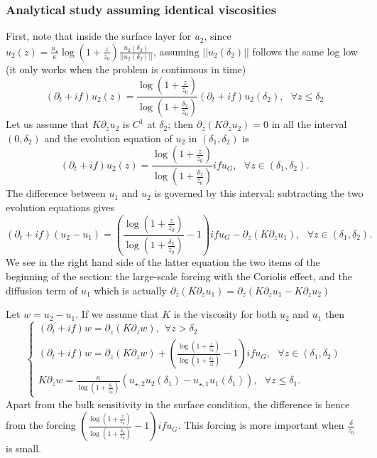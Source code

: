 \subsubsection{Analytical study assuming identical viscosities}
First, note that inside the surface layer for $u_2$,
since $u_2(z) = \frac{u_\star}{\kappa}\log(1+\frac{z}{z_0})
\frac{u_2(\delta_{2})}{||u_2(\delta_{2})||}$, assuming
$||u_2(\delta_{2})||$ follows the same log low (it only works
when the problem is continuous in time)
\begin{equation}
(\partial_t + if) u_2(z) = \frac{\log(1+\frac{z}{z_0})}
{\log(1+\frac{\delta_2}{z_0})}(\partial_t + if) u_2(\delta_2), 
~~~\forall z \leq \delta_2
\end{equation}
Let us assume that $K\partial_z u_2$ is $C^1$ at $\delta_2$;
then $\partial_z (K\partial_z u_2) = 0$ in all the interval
$(0, \delta_2)$ and the evolution equation of $u_2$ in
$(\delta_1, \delta_2)$ is
\begin{equation}
(\partial_t + if) u_2(z) = \frac{\log(1+\frac{z}{z_0})}
{\log(1+\frac{\delta_2}{z_0})} i f u_G, 
	~~~\forall z \in (\delta_1, \delta_2).
\end{equation}
The difference between $u_1$ and $u_2$ is governed by this interval:
subtracting the two evolution equations gives
\begin{equation}
(\partial_t + if) (u_2 - u_1) = \left(\frac{\log(1+\frac{z}{z_0})}
{\log(1+\frac{\delta_2}{z_0})} - 1\right)i f u_G 
-
\partial_z (K \partial_z u_1), ~~~\forall z \in (\delta_1, \delta_2).
\end{equation}
We see in the right hand side of the latter equation the two items
of the beginning of the section:
the large-scale forcing with the Coriolis effect,
and the diffusion term of $u_1$ which is actually
$\partial_z (K \partial_z u_1) = \partial_z (K \partial_z u_1 - K \partial_z u_2)$

Let $w=u_2 - u_1$. If we assume that $K$ is the viscosity for both
$u_2$ and $u_1$ then
\begin{equation}
	\begin{cases}
		(\partial_t + if) w = \partial_z (K \partial_z w) ,
		~~ \forall z > \delta_2 \\
(\partial_t + if) w = \partial_z (K \partial_z w) + \left(\frac{\log(1+\frac{z}{z_0})}
{\log(1+\frac{\delta_2}{z_0})} - 1\right)i f u_G 
, ~~~\forall z \in (\delta_1, \delta_2) \\
		K \partial_z w = \frac{\kappa}
		{\log(1+\frac{\delta_1}{z_0})}\left(
		u_{\star, 2} u_2(\delta_1) -
		u_{\star, 1} u_1(\delta_1)\right),
		~~~ \forall z \leq \delta_1.
	\end{cases}
\end{equation}
Apart from the bulk sensitivity in the surface condition,
the difference is hence from the forcing
$\left(\frac{\log(1+\frac{z}{z_0})}
{\log(1+\frac{\delta_2}{z_0})} - 1\right)i f u_G$.
This forcing is more important when $\frac{\delta}{z_0}$
is small.
